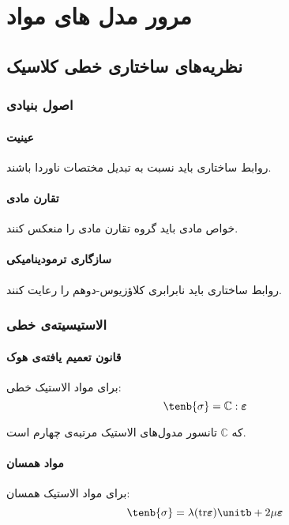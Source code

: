 \chapter{مرور مدل های مواد}

\section{نظریه‌های ساختاری خطی کلاسیک}

\subsection{اصول بنیادی}

\subsubsection{عینیت}
روابط ساختاری باید نسبت به تبدیل مختصات ناوردا باشند.

\subsubsection{تقارن مادی}
خواص مادی باید گروه تقارن مادی را منعکس کنند.

\subsubsection{سازگاری ترمودینامیکی}
روابط ساختاری باید نابرابری کلاؤزیوس-دوهم را رعایت کنند.

\subsection{الاستیسیته‌ی خطی}

\subsubsection{قانون تعمیم یافته‌ی هوک}
برای مواد الاستیک خطی:
\begin{equation}
	\tenb{\sigma} = \mathbb{C} : \boldsymbol{\varepsilon}
\end{equation}

که $\mathbb{C}$ تانسور مدول‌های الاستیک مرتبه‌ی چهارم است.

\subsubsection{مواد همسان}
برای مواد الاستیک همسان:
\begin{equation}
	\tenb{\sigma} = \lambda (\text{tr} \boldsymbol{\varepsilon}) \unitb + 2\mu \boldsymbol{\varepsilon}
\end{equation}

